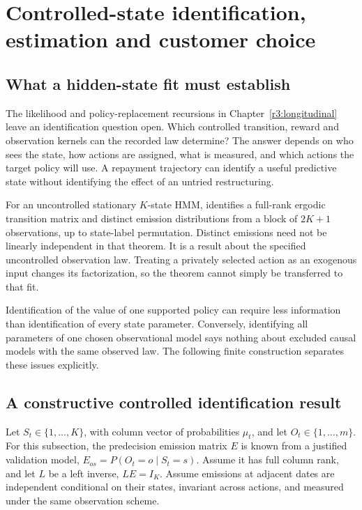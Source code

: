 \chapter{Controlled-state identification, estimation and customer choice}
\label{r3:controlled-identification}
\section{What a hidden-state fit must establish}
The likelihood and policy-replacement recursions in
Chapter~\ref{r3:longitudinal} leave an identification question open.
Which controlled transition, reward and observation kernels can the
recorded law determine? The answer depends on who sees the state,
how actions are assigned, what is measured, and which actions the target
policy will use. A repayment trajectory can identify a useful predictive
state without identifying the effect of an untried restructuring.

For an uncontrolled stationary $K$-state HMM,
\citet[Assumptions A1--A3, Theorem 1]{hmmident2016} identifies a
full-rank ergodic transition matrix and distinct emission distributions
from a block of $2K+1$ observations, up to state-label permutation.
Distinct emissions need not be linearly independent in that theorem.
It is a result about the specified uncontrolled observation law.
Treating a privately selected action as an exogenous input changes its
factorization, so the theorem cannot simply be transferred to that fit.

Identification of the value of one supported policy can require less
information than identification of every state parameter. Conversely,
identifying all parameters of one chosen observational model says
nothing about excluded causal models with the same observed law.
The following finite construction separates these issues explicitly.

\section{A constructive controlled identification result}
\label{r3:known-emission}
Let $S_t\in\{1,\ldots,K\}$, with column vector of probabilities
$\mu_t$, and let $O_t\in\{1,\ldots,m\}$. For this subsection,
the predecision emission matrix $E$ is known from a justified validation
model, $E_{os}=P(O_t=o\mid S_t=s)$. Assume it has full column rank,
and let $L$ be a left inverse, $LE=I_K$. Assume emissions at adjacent
dates are independent conditional on their states, invariant across
actions, and measured under the same observation scheme.

